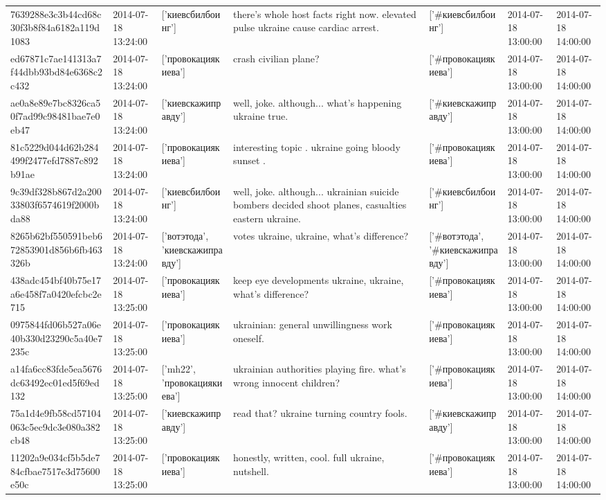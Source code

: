 \begin{tabular}{lllllll}
7639288e3c3b44cd68c30f3b8f84a6182a119d1083 & 2014-07-18 13:24:00 & ['киевсбилбоинг'] & there's whole host facts right now. elevated pulse ukraine cause cardiac arrest. & ['#киевсбилбоинг'] & 2014-07-18 13:00:00 & 2014-07-18 14:00:00 \\
ed67871c7ae141313a7f44dbb93bd84e6368c2c432 & 2014-07-18 13:24:00 & ['провокациякиева'] & crash civilian plane? & ['#провокациякиева'] & 2014-07-18 13:00:00 & 2014-07-18 14:00:00 \\
ae0a8e89e7bc8326ca50f7ad99c98481bae7e0eb47 & 2014-07-18 13:24:00 & ['киевскажиправду'] & well, joke. although... what's happening ukraine true. & ['#киевскажиправду'] & 2014-07-18 13:00:00 & 2014-07-18 14:00:00 \\
81c5229d044d62b284499f2477efd7887c892b91ae & 2014-07-18 13:24:00 & ['провокациякиева'] & interesting topic . ukraine going bloody sunset . & ['#провокациякиева'] & 2014-07-18 13:00:00 & 2014-07-18 14:00:00 \\
9c39df328b867d2a20033803f6574619f2000bda88 & 2014-07-18 13:24:00 & ['киевсбилбоинг'] & well, joke. although... ukrainian suicide bombers decided shoot planes, casualties eastern ukraine. & ['#киевсбилбоинг'] & 2014-07-18 13:00:00 & 2014-07-18 14:00:00 \\
8265b62bf550591beb672853901d856b6fb463326b & 2014-07-18 13:24:00 & ['вотэтода', 'киевскажиправду'] & votes ukraine, ukraine, what's difference? & ['#вотэтода', '#киевскажиправду'] & 2014-07-18 13:00:00 & 2014-07-18 14:00:00 \\
438adc454bf40b75e17a6e458f7a0420efcbc2e715 & 2014-07-18 13:25:00 & ['провокациякиева'] & keep eye developments ukraine, ukraine, what's difference? & ['#провокациякиева'] & 2014-07-18 13:00:00 & 2014-07-18 14:00:00 \\
0975844fd06b527a06e40b330d23290c5a40e7235c & 2014-07-18 13:25:00 & ['провокациякиева'] & ukrainian: general unwillingness work oneself. & ['#провокациякиева'] & 2014-07-18 13:00:00 & 2014-07-18 14:00:00 \\
a14fa6cc83fde5ea5676dc63492ec01ed5f69ed132 & 2014-07-18 13:25:00 & ['mh22', 'провокациякиева'] & ukrainian authorities playing fire. what's wrong innocent children? & ['#провокациякиева'] & 2014-07-18 13:00:00 & 2014-07-18 14:00:00 \\
75a1d4e9fb58cd57104063c5ec9dc3e080a382cb48 & 2014-07-18 13:25:00 & ['киевскажиправду'] & read that? ukraine turning country fools. & ['#киевскажиправду'] & 2014-07-18 13:00:00 & 2014-07-18 14:00:00 \\
11202a9e034cf5b5de784cfbae7517e3d75600e50c & 2014-07-18 13:25:00 & ['провокациякиева'] & honestly, written, cool. full ukraine, nutshell. & ['#провокациякиева'] & 2014-07-18 13:00:00 & 2014-07-18 14:00:00 \\

\end{tabular}
